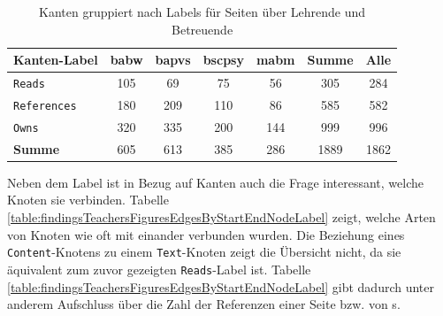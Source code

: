     \begin{table}[htb]
        \centering
        \begin{tabular}{|l|c|c|c|c|c|c|}
            \hline
            \multicolumn{1}{|c|}{\textbf{Kanten-Label}} & \textbf{\gls{babw}} & \textbf{\gls{bapvs}} & \textbf{\gls{bscpsy}} & \textbf{\gls{mabm}} & \textbf{Summe} & \textbf{Alle} \\ \hline
            \texttt{Reads}                                       & 105           & 69             & 75              & 56            & 305            & 284           \\ \hline
            \texttt{References}                                  & 180           & 209            & 110             & 86            & 585            & 582           \\ \hline
            \texttt{Owns}                                        & 320           & 335            & 200             & 144           & 999            & 996           \\ \hline
            \hline
            \textbf{Summe}                              & 605           & 613            & 385             & 286           & 1889           & 1862          \\ \hline
        \end{tabular}
        \caption{Kanten gruppiert nach Labels für Seiten über Lehrende und Betreuende}
        \label{table:findingTeachersFiguresEdgesByLabel}
    \end{table}

    Neben dem Label ist in Bezug auf Kanten auch die Frage interessant,
    welche Knoten sie verbinden.
    Tabelle \ref{table:findingsTeachersFiguresEdgesByStartEndNodeLabel}
    zeigt, welche Arten von Knoten wie oft mit einander verbunden wurden.
    Die Beziehung eines \texttt{Content}-Knotens zu einem \texttt{Text}-Knoten
    zeigt die Übersicht nicht,
    da sie äquivalent zum zuvor gezeigten \texttt{Reads}-Label ist.
    Tabelle \ref{table:findingsTeachersFiguresEdgesByStartEndNodeLabel} gibt dadurch unter anderem Aufschluss über die Zahl der Referenzen
    einer Seite bzw. von {\contentFeature}s.

